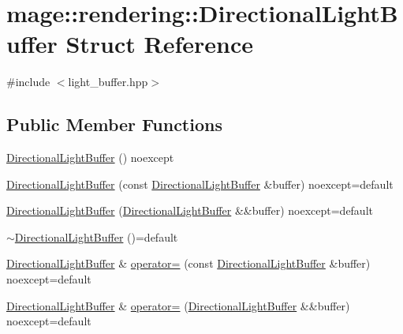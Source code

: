 \hypertarget{structmage_1_1rendering_1_1_directional_light_buffer}{}\section{mage\+:\+:rendering\+:\+:Directional\+Light\+Buffer Struct Reference}
\label{structmage_1_1rendering_1_1_directional_light_buffer}


{\ttfamily \#include $<$light\+\_\+buffer.\+hpp$>$}

\subsection*{Public Member Functions}
\begin{DoxyCompactItemize}
\item 
\mbox{\hyperlink{structmage_1_1rendering_1_1_directional_light_buffer_a618dbd63423f0f008ef18c5e5a7fe560}{Directional\+Light\+Buffer}} () noexcept
\item 
\mbox{\hyperlink{structmage_1_1rendering_1_1_directional_light_buffer_a8bd677130e2bc44b721935396f3ee9ac}{Directional\+Light\+Buffer}} (const \mbox{\hyperlink{structmage_1_1rendering_1_1_directional_light_buffer}{Directional\+Light\+Buffer}} \&buffer) noexcept=default
\item 
\mbox{\hyperlink{structmage_1_1rendering_1_1_directional_light_buffer_a2db095d74145a02eb6c6c306501b04e8}{Directional\+Light\+Buffer}} (\mbox{\hyperlink{structmage_1_1rendering_1_1_directional_light_buffer}{Directional\+Light\+Buffer}} \&\&buffer) noexcept=default
\item 
\mbox{\hyperlink{structmage_1_1rendering_1_1_directional_light_buffer_ac52791a07948b17670c13b4aa0ddb104}{$\sim$\+Directional\+Light\+Buffer}} ()=default
\item 
\mbox{\hyperlink{structmage_1_1rendering_1_1_directional_light_buffer}{Directional\+Light\+Buffer}} \& \mbox{\hyperlink{structmage_1_1rendering_1_1_directional_light_buffer_ae2dfc882b678be7ae81b6d51b55f74bc}{operator=}} (const \mbox{\hyperlink{structmage_1_1rendering_1_1_directional_light_buffer}{Directional\+Light\+Buffer}} \&buffer) noexcept=default
\item 
\mbox{\hyperlink{structmage_1_1rendering_1_1_directional_light_buffer}{Directional\+Light\+Buffer}} \& \mbox{\hyperlink{structmage_1_1rendering_1_1_directional_light_buffer_adb98ba5e4772ab90af749e521a6a6593}{operator=}} (\mbox{\hyperlink{structmage_1_1rendering_1_1_directional_light_buffer}{Directional\+Light\+Buffer}} \&\&buffer) noexcept=default
\end{DoxyCompactItemize}
